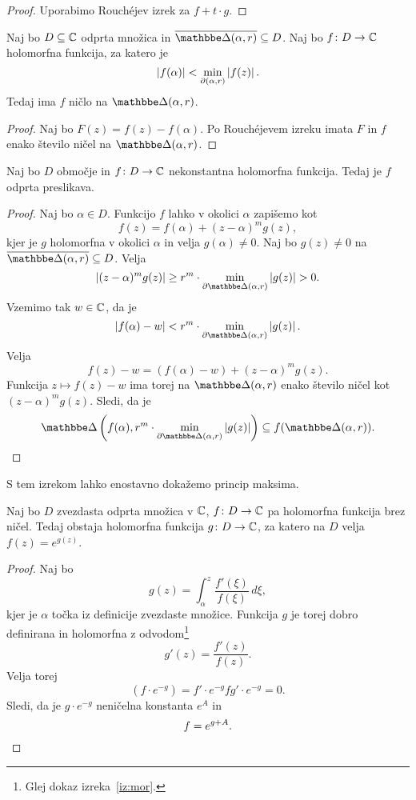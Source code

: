 \begin{proof}
Uporabimo Rouchéjev izrek za $f + t \cdot g$.
\end{proof}

\begin{posledica}
Naj bo $D \subseteq \mathbb{C}$ odprta množica in
$\oline{\dsk(\alpha, r)} \subseteq D$. Naj bo $f \colon D \to \mathbb{C}$
holomorfna funkcija, za katero je
\[
\left\lvert f(\alpha)\right\rvert < \min_{\partial(\alpha, r)} \left\lvert f(z)\right\rvert.
\]
Tedaj ima $f$ ničlo na $\dsk(\alpha, r)$.
\end{posledica}

\begin{proof}
Naj bo $F(z) = f(z) - f(\alpha)$. Po Rouchéjevem izreku imata $F$
in $f$ enako število ničel na $\dsk(\alpha, r)$.
\end{proof}

\begin{izrek}
Naj bo $D$ območje in $f \colon D \to \mathbb{C}$ nekonstantna holomorfna
funkcija. Tedaj je $f$ odprta preslikava.
\end{izrek}

\begin{proof}
Naj bo $\alpha \in D$. Funkcijo $f$ lahko v okolici $\alpha$
zapišemo kot
\[
f(z) = f(\alpha) + (z - \alpha)^m g(z),
\]
kjer je $g$ holomorfna v okolici $\alpha$ in velja
$g(\alpha) \ne 0$. Naj bo $g(z) \ne 0$ na
$\oline{\dsk(\alpha, r)} \subseteq D$. Velja
\[
\abs{(z - \alpha)^m g(z)} \geq
r^m \cdot \min_{\partial \dsk(\alpha, r)} \abs{g(z)} > 0.
\]
Vzemimo tak $w \in \mathbb{C}$, da je
\[
\abs{f(\alpha) - w} <
r^m \cdot \min_{\partial \dsk(\alpha, r)} \abs{g(z)}.
\]
Velja
\[
f(z) - w = (f(\alpha) - w) + (z - \alpha)^m g(z).
\]
Funkcija $z \mapsto f(z) - w$ ima torej na $\dsk(\alpha, r)$ enako
število ničel kot $(z - \alpha)^m g(z)$. Sledi, da je
\[
\dsk\left(f(\alpha),
r^m \cdot \min_{\partial \dsk(\alpha, r)} \abs{g(z)}\right)
\subseteq
f(\dsk(\alpha, r)). \qedhere
\]
\end{proof}

\begin{opomba}
S tem izrekom lahko enostavno dokažemo princip maksima.
\end{opomba}

\begin{trditev}
Naj bo $D$ zvezdasta odprta množica v $\mathbb{C}$, $f \colon D \to \mathbb{C}$ pa
holomorfna funkcija brez ničel. Tedaj obstaja holomorfna funkcija
$g \colon D \to \mathbb{C}$, za katero na $D$ velja $f(z) = e^{g(z)}$.
\end{trditev}

\begin{proof}
Naj bo
\[
g(z) = \int_\alpha^z \frac{f'(\xi)}{f(\xi)}\,d\xi,
\]
kjer je $\alpha$ točka iz definicije zvezdaste množice. Funkcija
$g$ je torej dobro definirana in holomorfna z odvodom\footnote{Glej
dokaz izreka~\ref{iz:mor}.}
\[
g'(z) = \frac{f'(z)}{f(z)}.
\]
Velja torej
\[
\left(f \cdot e^{-g}\right) =
f' \cdot e^{-g}  fg' \cdot e^{-g} = 0.
\]
Sledi, da je $g \cdot e^{-g}$ neničelna konstanta $e^A$ in
\[
f = e^{g + A}. \qedhere
\]
\end{proof}

